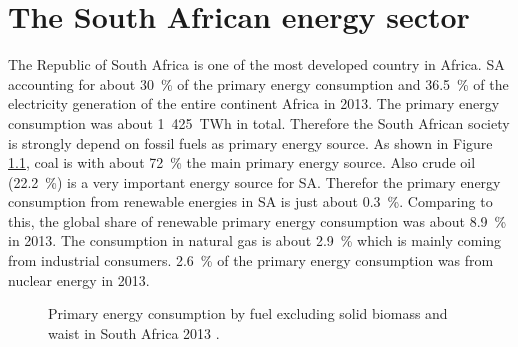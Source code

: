 \documentclass[Master,MEE,english]{twbook}%
\begin{document}
\chapter{The South African energy sector}
The Republic of South Africa is one of the most developed country in Africa. SA accounting for about 30~\% of the primary energy consumption and 36.5~\% of the electricity generation of the entire continent Africa in 2013. The primary energy consumption was about 1~425~TWh in total. Therefore the South African society is strongly depend on fossil fuels as primary energy source. As shown in Figure \ref{PEKreis}, coal is with about 72~\% the main primary energy source. Also crude oil (22.2~\%) is a very important energy source for SA. Therefor the primary energy consumption from renewable energies in SA is just about 0.3~\%. Comparing to this, the global share of  renewable primary energy consumption was about 8.9~\% in 2013. The consumption in natural gas is about 2.9~\% which is mainly coming from industrial consumers. 2.6~\% of the primary energy consumption was from nuclear energy in 2013. \cite{BP2014b,Agency2015}
%
\begin{figure}[!h] %
\centering
\def\angle{0}
\def\radius{2.5}
\def\cyclelist{{"brown","orange","yellow","black","green"}}
\newcount\cyclecount {}
\newcount\ind {}

\caption[Primary energy consumption by fuel excluding solid biomass and waist in South Africa 2013.]{Primary energy consumption by fuel excluding solid biomass and waist in South Africa 2013 \cite{BP2014b}.}\label{PEKreis}
\end{figure}
\end{document}

